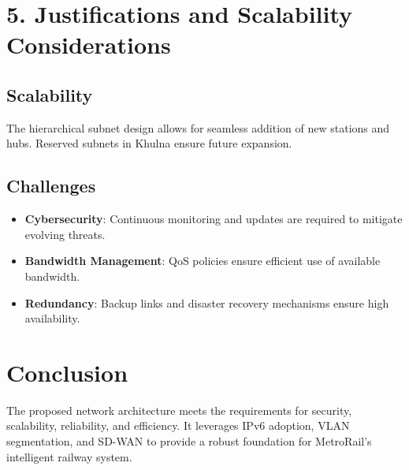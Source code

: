 \documentclass[12pt]{article}
\begin{document}
\section*{5. Justifications and Scalability Considerations}

\subsection*{Scalability}
The hierarchical subnet design allows for seamless addition of new stations and hubs. Reserved subnets in Khulna ensure future expansion.

\subsection*{Challenges}
\begin{itemize}
    \item \textbf{Cybersecurity}: Continuous monitoring and updates are required to mitigate evolving threats.
    \item \textbf{Bandwidth Management}: QoS policies ensure efficient use of available bandwidth.
    \item \textbf{Redundancy}: Backup links and disaster recovery mechanisms ensure high availability.
\end{itemize}

\section*{Conclusion}
The proposed network architecture meets the requirements for security, scalability, reliability, and efficiency. It leverages IPv6 adoption, VLAN segmentation, and SD-WAN to provide a robust foundation for MetroRail's intelligent railway system.
\end{document}
